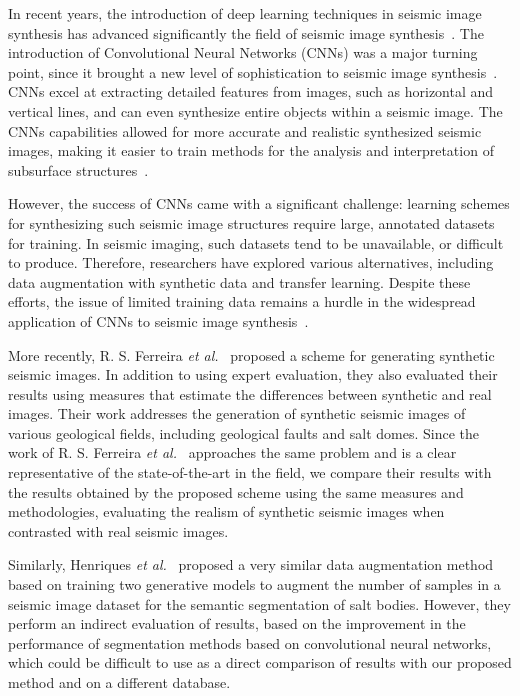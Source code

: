 \documentclass{ieeeaccess}
\begin{document}
In recent years, the introduction of deep learning techniques in seismic image synthesis has advanced significantly  the field of seismic image synthesis~\cite{Zeng2019}. The introduction of Convolutional Neural Networks (CNNs) was a major turning point, since it brought a new level of sophistication to seismic image synthesis~\cite{Powers2011}. CNNs excel at extracting detailed features from images, such as horizontal and vertical lines, and can even synthesize entire objects within a seismic image. The CNNs capabilities allowed for more accurate and realistic synthesized seismic images,  making it easier to train methods for the analysis and interpretation of subsurface structures~\cite{Powers2011}. 

However, the success of CNNs came with a significant challenge: learning schemes for synthesizing such seismic image structures require large, annotated datasets for training. In seismic imaging, such datasets tend to be unavailable, or difficult to produce. Therefore, researchers have explored various alternatives, including data augmentation with synthetic data and transfer learning. Despite these efforts, the issue of limited training data remains a hurdle in the widespread application of CNNs to seismic image synthesis~\cite{Wang2021}.

More recently, R. S. Ferreira \emph{et al.}~\cite{Ferreira2020} proposed a scheme for generating synthetic seismic images. In addition to using expert evaluation, they also evaluated their results using measures that estimate the differences between synthetic and real images. Their work addresses the generation of synthetic seismic images of various geological fields, including geological faults and salt domes. Since the work of R. S. Ferreira \emph{et al.}~\cite{Ferreira2020} approaches the same problem and is a clear representative of the state-of-the-art in the field, we compare their results with the results obtained by the proposed scheme using the same measures and methodologies, evaluating the realism of synthetic seismic images when contrasted with real seismic images.

Similarly, Henriques \emph{et al.}~\cite{Henriques2021} proposed a very similar data augmentation method based on training two generative models to augment the number of samples in a seismic image dataset for the semantic segmentation of salt bodies. However, they perform an indirect evaluation of results, based on the improvement in the performance of segmentation methods based on convolutional neural networks, which could be difficult to use as a direct comparison of results with our proposed method and on a different database.
\end{document}
